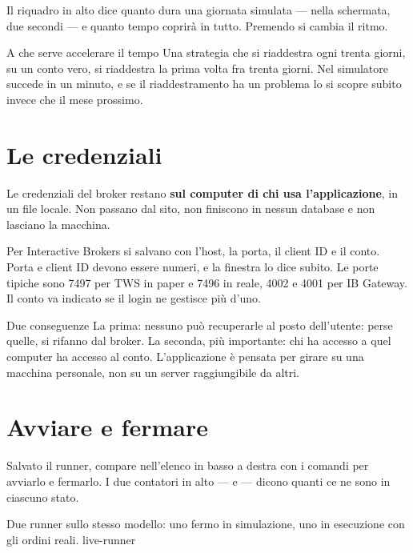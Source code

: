 Il riquadro  in alto dice quanto dura una giornata
simulata --- nella schermata, due secondi --- e quanto tempo coprirà in
tutto. Premendo  si cambia il ritmo.

\begin{nota}{A che serve accelerare il tempo}
Una strategia che si riaddestra ogni trenta giorni, su un conto vero, si
riaddestra la prima volta fra trenta giorni. Nel simulatore succede in un
minuto, e se il riaddestramento ha un problema lo si scopre subito invece
che il mese prossimo.
\end{nota}

\section{Le credenziali}\label{sez:credenziali}

Le credenziali del broker restano \textbf{sul computer di chi usa
l'applicazione}, in un file locale. Non passano dal sito, non finiscono in
nessun database e non lasciano la macchina.

Per Interactive Brokers si salvano con  l'host, la
porta, il client ID e il conto. Porta e client ID devono essere numeri, e la
finestra lo dice subito. Le porte tipiche sono \num{7497} per TWS in paper e
\num{7496} in reale, \num{4002} e \num{4001} per IB Gateway. Il conto va
indicato se il login ne gestisce più d'uno.

\begin{attenzione}{Due conseguenze}
La prima: nessuno può recuperarle al posto dell'utente: perse quelle, si
rifanno dal broker. La seconda, più importante: chi ha accesso a quel
computer ha accesso al conto. L'applicazione è pensata per girare su una
macchina personale, non su un server raggiungibile da altri.
\end{attenzione}

\section{Avviare e fermare}\label{sez:avviare}

Salvato il runner, compare nell'elenco in basso a destra con i comandi per
avviarlo e fermarlo. I due contatori in alto ---  e
 --- dicono quanti ce ne sono in ciascuno stato.

  {Due runner sullo stesso modello: uno fermo in simulazione, uno in
   esecuzione con gli ordini reali.}
  {live-runner}

